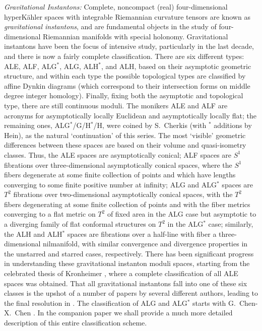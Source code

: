 \documentclass[12pt,letterpaper,reqno]{amsart}
\theoremstyle{remark}
\theoremstyle{definition}
\numberwithin{thm}{section}
\numberwithin{equation}{section}
\numberwithin{figure}{section}
\begin{document}
\noindent\emph{Gravitational Instantons:} Complete, noncompact (real) four-dimensional hyperK\"ahler spaces with integrable Riemannian curvature tensors are known as \emph{gravitational instantons}, and are fundamental objects in the study of four-dimensional 
Riemannian manifolds with special holonomy.  
Gravitational instantons have been the focus of intensive study, particularly in the last decade, and there is now a fairly complete classification.  There are six 
different types: ALE, ALF, ALG${}^*$, ALG, ALH${}^*$, and ALH, 
based on their asymptotic geometric structure, and within each type the possible topological types are classified by affine Dynkin
diagrams (which correspond to their intersection forms on middle degree integer homology). Finally, fixing both the asymptotic and 
topological type, there are still continuous moduli.  The monikers ALE and ALF are acronyms for asymptotically locally Euclidean and 
asymptotically locally flat; the remaining ones, ALG${}^*$/G/H${}^*$/H, were coined by S.\ Cherkis (with ${}^*$ additions by Hein), 
as the natural `continuation' of this series.  The most `visible' geometric differences between these spaces are based on their 
volume and quasi-isometry classes. Thus, the ALE spaces are asymptotically conical; ALF spaces are $S^1$ fibrations over three-dimensional
asymptotically conical spaces, where the $S^1$ fibers degenerate at some finite collection of points and which have lengths converging to
some finite positive number at infinity; ALG and ALG${}^*$ spaces are $T^2$ fibrations over two-dimensional asymptotically conical spaces,
with the $T^2$ fibers degenerating at some finite collection of points and with the fiber metrics converging to a flat metric on $T^2$ of fixed
area in the ALG case but asymptotic to a diverging family of flat conformal structures on $T^2$ in the ALG${}^*$ case; similarly, the 
ALH and ALH${}^*$ spaces are fibrations over a half-line with fiber a three-dimensional nilmanifold, with similar convergence and divergence
properties in the unstarred and starred cases, respectively.  There has been significant progress in understanding these gravitational 
instanton moduli spaces, starting from the celebrated thesis of Kronheimer \cite{Kronheimerconstruction, KronheimerTorelli}, where a complete classification of all ALE spaces was 
obtained. That all gravitational instantons fall into one of these six classes is the upshot of a number of papers by several different authors, leading to the final resolution in \cite{SunZhang}. The classification of ALG and ALG${}^*$ 
starts with G.\ Chen-X.\ Chen \cite{ChenChenI, ChenChenIII}. 
In the companion paper we shall provide a much more detailed description of this entire classification scheme.
\end{document}
